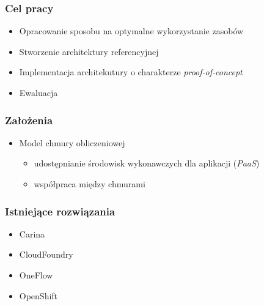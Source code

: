 \documentclass{beamer}
\begin{document}
\begin{frame}
\frametitle{Cel pracy}

\begin{itemize}
\item Opracowanie sposobu na optymalne wykorzystanie zasobów

\item Stworzenie architektury referencyjnej
\item Implementacja architekutury o charakterze \textit{proof-of-concept}
\item Ewaluacja
\end{itemize}

\end{frame}





\begin{frame}
\frametitle{Założenia}

\begin{itemize}
\item Model chmury obliczeniowej
	\begin{itemize}
		\item udostępnianie środowisk wykonawczych dla aplikacji (\textit{PaaS})
		\item współpraca między chmurami
	\end{itemize}
\end{itemize}

\end{frame}





\begin{frame}
\frametitle{Istniejące rozwiązania}

\begin{itemize}
\item Carina
\item CloudFoundry

\item OneFlow
\item OpenShift
\end{itemize}

\end{frame}
\end{document}
